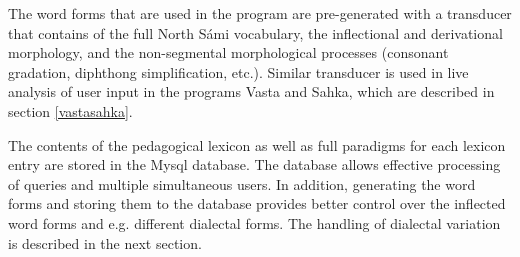 \documentclass[11pt]{article}
\begin{document}
The word forms that are used in the program are pre-generated with a transducer that contains of the full North Sámi vocabulary, the inflectional and derivational morphology, and the non-segmental morphological processes (consonant gradation, diphthong simplification, etc.). Similar transducer is used in live analysis of user input in the programs Vasta and Sahka, which are described in section \ref{vastasahka}.%
%

The contents of the pedagogical lexicon as well as full paradigms for each lexicon entry are stored in the Mysql database. The database allows effective processing of queries and multiple simultaneous users. In addition, generating the word forms and storing them to the database provides better control over the inflected word forms and e.g. different dialectal forms. The handling of dialectal variation is described in the next section.

\end{document}
